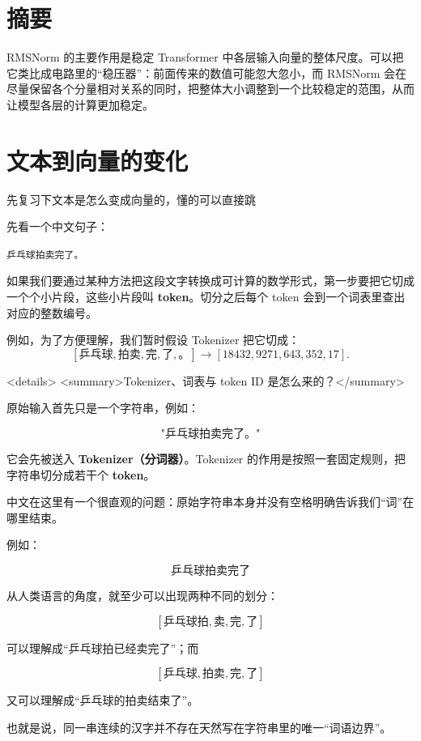 \documentclass[UTF8,11pt,a4paper]{ctexart}
\title{\Huge RMSNorm：\[.35em]\Large 起一个稳压器的作用}
\begin{document}
\maketitle
\section{摘要}
RMSNorm 的主要作用是稳定 Transformer 中各层输入向量的整体尺度。可以把它类比成电路里的“稳压器”：前面传来的数值可能忽大忽小，而 RMSNorm 会在尽量保留各个分量相对关系的同时，把整体大小调整到一个比较稳定的范围，从而让模型各层的计算更加稳定。
\section{文本到向量的变化}
先复习下文本是怎么变成向量的，懂的可以直接跳

先看一个中文句子：
\begin{center}
\texttt{乒乓球拍卖完了。}
\end{center}

如果我们要通过某种方法把这段文字转换成可计算的数学形式，第一步要把它切成一个个小片段，这些小片段叫 \textbf{token}。切分之后每个 token 会到一个词表里查出对应的整数编号。

例如，为了方便理解，我们暂时假设 Tokenizer 把它切成：
\[
[\texttt{乒乓球},\texttt{拍卖},\texttt{完},
 \texttt{了},\texttt{。}]
\longrightarrow
[18432,9271,643,352,17].
\]

<details>
<summary>Tokenizer、词表与 token ID 是怎么来的？</summary>

原始输入首先只是一个字符串，例如：

\[
\texttt{"乒乓球拍卖完了。"}
\]

它会先被送入 \textbf{Tokenizer（分词器）}。Tokenizer 的作用是按照一套固定规则，把字符串切分成若干个 \textbf{token}。

中文在这里有一个很直观的问题：原始字符串本身并没有空格明确告诉我们“词”在哪里结束。

例如：

\[
\texttt{乒乓球拍卖完了}
\]

从人类语言的角度，就至少可以出现两种不同的划分：

\[
[\texttt{乒乓球拍},\texttt{卖},\texttt{完},\texttt{了}]
\]

可以理解成“乒乓球拍已经卖完了”；而

\[
[\texttt{乒乓球},\texttt{拍卖},\texttt{完},\texttt{了}]
\]

又可以理解成“乒乓球的拍卖结束了”。

也就是说，同一串连续的汉字并不存在天然写在字符串里的唯一“词语边界”。
\end{document}
